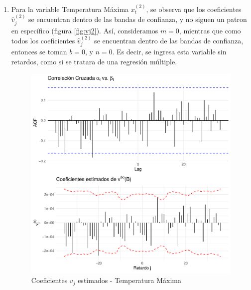 \documentclass[12pt,oneside]{book}\usepackage[]{graphicx}\usepackage[]{color}
\makeatletter
\def\maxwidth{ %
  \ifdim\Gin@nat@width>\linewidth
    \linewidth
  \else
    \Gin@nat@width
  \fi
}
\newenvironment{knitrout}{}{} %
\theoremstyle{definition} %
\makeatother
\begin{document}
\begin{enumerate}
\begin{knitrout}
\end{knitrout}



\item Para la variable Temperatura Máxima $x_t^{(2)}$, se observa que los coeficientes $\hat v_j^{(2)}$ se encuentran dentro de las bandas de confianza, y no siguen un patron en específico (figura \ref{fig:vj2}). Así, consideramos $m=0$, mientras que como todos los coeficientes $\hat v_j^{(2)}$ se encuentran dentro de las bandas de confianza, entonces se toman $b=0$, y $n=0$. Es decir, se ingresa esta variable sin retardos, como si se tratara de una regresión múltiple.




\begin{knitrout}
\color{fgcolor}\begin{figure}[H]

{\centering \includegraphics[width=\maxwidth]{figure/unnamed-chunk-42-1} 

}

\caption{\label{fig:vj2} Coeficientes $v_j$ estimados - Temperatura Máxima}\label{fig:unnamed-chunk-42}
\end{figure}


\end{knitrout}



\end{enumerate}
\end{document}

